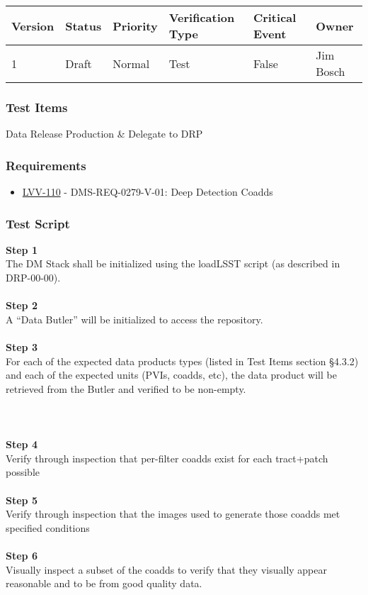 \begin{longtable}[]{@{}llllll@{}}
\toprule
Version & Status & Priority & Verification Type & Critical Event &
Owner\tabularnewline
\midrule
\endhead
1 & Draft & Normal & Test & False & Jim Bosch\tabularnewline
\bottomrule
\end{longtable}

\hypertarget{test-items-49}{%
\subsubsection{Test Items}\label{test-items-49}}

Data Release Production \& Delegate to DRP

\hypertarget{requirements-50}{%
\subsubsection{Requirements}\label{requirements-50}}

\begin{itemize}
\tightlist
\item
  \href{https://jira.lsstcorp.org/browse/LVV-110}{LVV-110} -
  DMS-REQ-0279-V-01: Deep Detection Coadds
\end{itemize}

\hypertarget{test-script-50}{%
\subsubsection{Test Script}\label{test-script-50}}

\textbf{Step 1}\\
The DM Stack shall be initialized using the loadLSST script (as
described in DRP-00-00).\\
~\\
\textbf{Step 2}\\
A ``Data Butler'' will be initialized to access the repository.\\
~\\
\textbf{Step 3}\\
For each of the expected data products types (listed in Test Items
section §4.3.2) and each of the expected units (PVIs, coadds, etc), the
data product will be retrieved from the Butler and verified to be
non-empty.\\
~\\
~\\
~\\
\textbf{Step 4}\\
Verify through inspection that per-filter coadds exist for each
tract+patch possible\\
~\\
\textbf{Step 5}\\
Verify through inspection that the images used to generate those coadds
met specified conditions\\
~\\
\textbf{Step 6}\\
Visually inspect a subset of the coadds to verify that they visually
appear reasonable and to be from good quality data.\\
~\\


